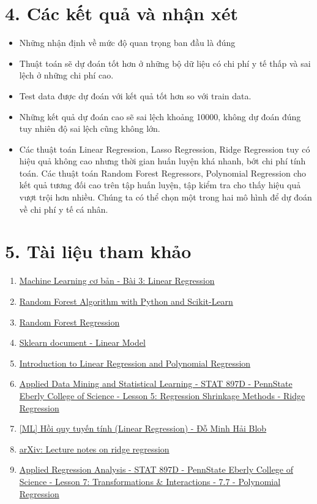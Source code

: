 \documentclass{article}
\begin{document}
	\section{4. Các kết quả và nhận xét}
	\begin{itemize}
		\item Những nhận định về mức độ quan trọng ban đầu là đúng
		\item Thuật toán sẽ dự đoán tốt hơn ở những bộ dữ liệu có chi phí y tế thấp và sai lệch ở những chi phí cao.
		\item Test data được dự đoán với kết quả tốt hơn so với train data.
		\item Những kết quả dự đoán cao sẽ sai lệch khoảng 10000, không dự đoán đúng tuy nhiên độ sai lệch cũng không lớn.
		\item Các thuật toán Linear Regression, Lasso Regression, Ridge Regression tuy có hiệu quả không cao nhưng thời gian huấn luyện khá nhanh, bớt chi phí tính toán. Các thuật toán Random Forest Regressors, Polynomial Regression cho kết quả tương đối cao trên tập huấn luyện, tập kiểm tra cho thấy hiệu quả vượt trội hơn nhiều. Chúng ta có thể chọn một trong hai mô hình để dự đoán về chi phí y tế cá nhân.
	\end{itemize}
	\section{5. Tài liệu tham khảo}
	\begin{enumerate}
		\item \href{https://machinelearningcoban.com/2016/12/28/linearregression/}{Machine Learning cơ bản - Bài 3: Linear Regression}
		\item \href{https://stackabuse.com/random-forest-algorithm-with-python-and-scikit-learn/}{Random Forest Algorithm with Python and Scikit-Learn}
		\item \href{https://levelup.gitconnected.com/random-forest-regression-209c0f354c84}{Random Forest Regression}
		\item \href{https://scikit-learn.org/stable/modules/linear_model.html#}{Sklearn document - Linear Model}
		\item \href{https://towardsdatascience.com/introduction-to-linear-regression-and-polynomial-regression-f8adc96f31cb}{Introduction to Linear Regression and Polynomial Regression}
		\item \href{https://online.stat.psu.edu/stat857/node/155/}{Applied Data Mining and Statistical Learning - STAT 897D - PennState Eberly College of Science - Lesson 5: Regression Shrinkage Methods - Ridge Regression}
		\item \href{https://dominhhai.github.io/vi/2017/12/ml-linear-regression/}{[ML] Hồi quy tuyến tính (Linear Regression) - Đỗ Minh Hải Blob}
		\item \href{https://arxiv.org/pdf/1509.09169;Lecture}{arXiv: Lecture notes on ridge regression}
		\item \href{https://online.stat.psu.edu/stat462/node/158/}{Applied Regression Analysis - STAT 897D - PennState Eberly College of Science - Lesson 7: Transformations \& Interactions - 7.7 - Polynomial Regression}
	\end{enumerate}
	
\end{document}
